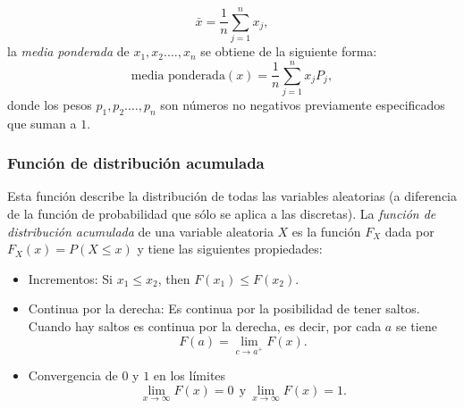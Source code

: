 \begin{equation}
\bar{x}=\frac{1}{n}\sum_{j=1}^{n}x_j,
\end{equation}
la \emph{media ponderada} de $x_1,x_2.\ldots,x_n$ se obtiene de la siguiente forma:
\begin{equation}
\text{media ponderada}(x)=\frac{1}{n}\sum_{j=1}^{n}x_jP_j,
\end{equation}
donde los pesos $p_1,p_2.\ldots,p_n$ son números no negativos previamente especificados que suman a $1$.
\subsubsection {Función de distribución acumulada}
Esta función describe la distribución de todas las variables aleatorias (a diferencia de la función de probabilidad que sólo se aplica a las discretas). La \emph{función de distribución acumulada} de una variable aleatoria $X$ es la función $F_X$ dada por $F_X(x)=P(X\leq x)$ y tiene las siguientes propiedades:
\begin{itemize}
	\item Incrementos: Si $x_1\leq x_2$, then $F(x_1)\leq F(x_2)$.
	\item Continua por la derecha: Es continua por la posibilidad de tener saltos. Cuando hay saltos es continua por la derecha, es decir, por cada $a$ se tiene
	\begin{equation}
	F(a)=\lim_{c\to a^+}F(x).
	\end{equation}
	\item Convergencia de $0$ y $1$ en los límites
	\begin{equation}
	\lim_{x\to \infty}F(x)=0\ \ \text{y}\ \lim_{x\to \infty}F(x)=1.
	\end{equation}
\end{itemize}

